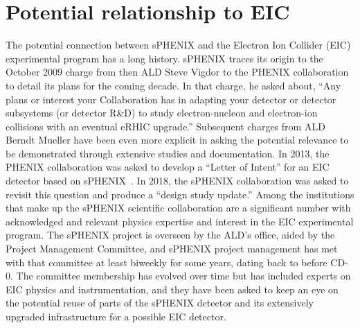 \section{Potential relationship to EIC}
\label{sec:eic}

The potential connection between sPHENIX and the Electron Ion Collider (EIC) experimental
program has a long history.  sPHENIX traces its origin to the October
2009 charge from then ALD Steve Vigdor to the PHENIX collaboration to
detail its plans for the coming decade.  In that charge, he asked
about, ``Any plans or interest your Collaboration has in adapting your
detector or detector subsystems (or detector R\&D) to study
electron-nucleon and electron-ion collisions with an eventual eRHIC
upgrade.''  Subsequent charges from ALD Berndt Mueller have been even
more explicit in asking the potential relevance to be demonstrated
through extensive studies and documentation.  In 2013, the PHENIX
collaboration was asked to develop a ``Letter of Intent'' for an EIC
detector based on sPHENIX~\cite{Adare:2014aaa}.  In 2018, the sPHENIX collaboration was
asked to revisit this question and produce a ``design study update.''
Among the institutions that make up the sPHENIX scientific
collaboration are a significant number with acknowledged and relevant
physics expertise and interest in the EIC experimental program.  The
sPHENIX project is overseen by the ALD's office, aided by the Project
Management Committee, and sPHENIX project management has met with that
committee at least biweekly for some years, dating back to before
CD-0.  The committee membership has evolved over time but has included
experts on EIC physics and instrumentation, and they have been asked
to keep an eye on the potential reuse of parts of the sPHENIX detector
and its extensively upgraded infrastructure for a possible EIC
detector.

